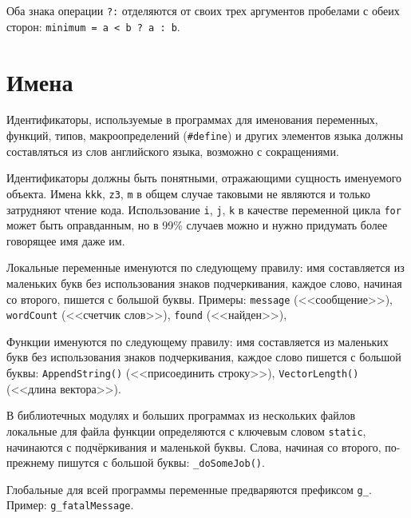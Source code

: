 \zzstyleitem

Оба знака операции \texttt{?:} отделяются от своих трех аргументов
пробелами с обеих сторон:
\texttt{minimum\ =\ a\ \textless{}\ b\ ?\ a\ :\ b}.


\section{Имена}


\zzstyleitem

Идентификаторы, используемые в программах для именования переменных,
функций, типов, макроопределений (\texttt{\#define}) и других элементов
языка должны составляться из слов английского языка, возможно с
сокращениями.

\zzstyleitem

Идентификаторы должны быть понятными, отражающими сущность именуемого
объекта. Имена \verb|kkk|, \verb|z3|, \verb|m| в общем случае таковыми не
являются и только затрудняют чтение кода. Использование \verb|i|, \verb|j|,
\verb|k| в качестве переменной цикла \texttt{for} может быть оправданным,
но в 99\% случаев можно и нужно придумать более говорящее имя даже им.

\zzstyleitem

Локальные переменные именуются по следующему правилу: имя составляется
из маленьких букв без использования знаков подчеркивания, каждое слово,
начиная со второго, пишется с большой буквы. Примеры: \texttt{message}
(<<сообщение>>), \texttt{wordCount} (<<счетчик слов>>), \texttt{found}
(<<найден>>),

\zzstyleitem

Функции именуются по следующему правилу: имя составляется из маленьких
букв без использования знаков подчеркивания, каждое слово пишется с
большой буквы: \texttt{AppendString()} (<<присоединить строку>>),
\texttt{VectorLength()} (<<длина вектора>>).

\zzstyleitem

В библиотечных модулях и больших программах из нескольких файлов
локальные для файла функции определяются с ключевым словом
\texttt{static}, начинаются с подчёркивания и маленькой буквы. Слова,
начиная со второго, по-прежнему пишутся с большой буквы:
\texttt{\_doSomeJob()}.

\zzstyleitem

Глобальные для всей программы переменные предваряются префиксом
\texttt{g\_}. Пример: \texttt{g\_fatalMessage}.

